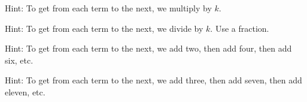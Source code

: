 \subsubsection*{ \answers}
\begin{apart}
    \item Hint: To get from each term to the next, we multiply by $k$.
    \item Hint: To get from each term to the next, we divide by $k$.  Use a fraction.
    \item Hint: To get from each term to the next, we add two, then add four, then add six, etc.
    \item Hint: To get from each term to the next, we add three, then add seven, then add eleven,  etc.
\end{apart}  




